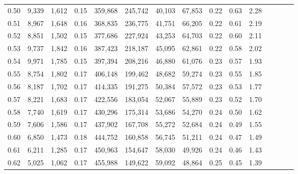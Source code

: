 \begin{tabular}{rrrcrrrrrrrrrrr}
0.50 &   9,339 &  1,612 &                                       0.15 &  359,868 &  245,742 &   40,103 &   67,853 &  0.22 &  0.63 &                         2.28 \\
0.51 &   8,967 &  1,648 &                                       0.16 &  368,835 &  236,775 &   41,751 &   66,205 &  0.22 &  0.61 &                         2.19 \\
0.52 &   8,851 &  1,502 &                                       0.15 &  377,686 &  227,924 &   43,253 &   64,703 &  0.22 &  0.60 &                         2.11 \\
0.53 &   9,737 &  1,842 &                                       0.16 &  387,423 &  218,187 &   45,095 &   62,861 &  0.22 &  0.58 &                         2.02 \\
0.54 &   9,971 &  1,785 &                                       0.15 &  397,394 &  208,216 &   46,880 &   61,076 &  0.23 &  0.57 &                         1.93 \\
0.55 &   8,754 &  1,802 &                                       0.17 &  406,148 &  199,462 &   48,682 &   59,274 &  0.23 &  0.55 &                         1.85 \\
0.56 &   8,187 &  1,702 &                                       0.17 &  414,335 &  191,275 &   50,384 &   57,572 &  0.23 &  0.53 &                         1.77 \\
0.57 &   8,221 &  1,683 &                                       0.17 &  422,556 &  183,054 &   52,067 &   55,889 &  0.23 &  0.52 &                         1.70 \\
0.58 &   7,740 &  1,619 &                                       0.17 &  430,296 &  175,314 &   53,686 &   54,270 &  0.24 &  0.50 &                         1.62 \\
0.59 &   7,606 &  1,586 &                                       0.17 &  437,902 &  167,708 &   55,272 &   52,684 &  0.24 &  0.49 &                         1.55 \\
0.60 &   6,850 &  1,473 &                                       0.18 &  444,752 &  160,858 &   56,745 &   51,211 &  0.24 &  0.47 &                         1.49 \\
0.61 &   6,211 &  1,285 &                                       0.17 &  450,963 &  154,647 &   58,030 &   49,926 &  0.24 &  0.46 &                         1.43 \\
0.62 &   5,025 &  1,062 &                                       0.17 &  455,988 &  149,622 &   59,092 &   48,864 &  0.25 &  0.45 &                         1.39 \\

\end{tabular}
